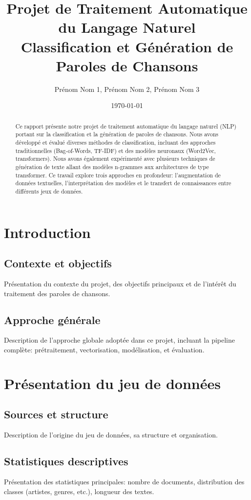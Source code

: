\documentclass[a4paper,11pt]{article}
\title{\textbf{Projet de Traitement Automatique du Langage Naturel\\
Classification et Génération de Paroles de Chansons}}
\author{Prénom Nom 1, Prénom Nom 2, Prénom Nom 3}
\date{\today}
\begin{document}
\maketitle

\begin{abstract}
Ce rapport présente notre projet de traitement automatique du langage naturel (NLP) portant sur la classification et la génération de paroles de chansons. Nous avons développé et évalué diverses méthodes de classification, incluant des approches traditionnelles (Bag-of-Words, TF-IDF) et des modèles neuronaux (Word2Vec, transformers). Nous avons également expérimenté avec plusieurs techniques de génération de texte allant des modèles n-grammes aux architectures de type transformer. Ce travail explore trois approches en profondeur: l'augmentation de données textuelles, l'interprétation des modèles et le transfert de connaissances entre différents jeux de données.
\end{abstract}

\tableofcontents
\newpage

\section{Introduction}
\subsection{Contexte et objectifs}
Présentation du contexte du projet, des objectifs principaux et de l'intérêt du traitement des paroles de chansons.

\subsection{Approche générale}
Description de l'approche globale adoptée dans ce projet, incluant la pipeline complète: prétraitement, vectorisation, modélisation, et évaluation.

\section{Présentation du jeu de données}
\label{sec:dataset}

\subsection{Sources et structure}
Description de l'origine du jeu de données, sa structure et organisation.

\subsection{Statistiques descriptives}
Présentation des statistiques principales: nombre de documents, distribution des classes (artistes, genres, etc.), longueur des textes.
\end{document}
